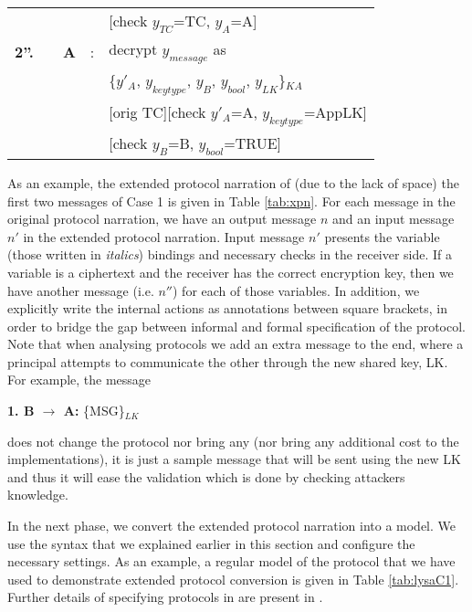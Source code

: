\begin{table}
\begin{tabular}{lllll}
               &                           &            & & [\textnormal{check } $y_{TC}$=TC, $y_A$=A]\\
\textbf{2''.} &                           &\textbf{A} &:& \textnormal{decrypt $y_{message}$ as }   \\
               &                           &            & & \{$y'_A$, $y_{keytype}$, $y_B$, $y_{bool}$, $y_{LK}$\}$_{KA}$\\
               &                           &            & & [\textnormal{orig TC}][\textnormal{check } $y'_A$=A, $y_{keytype}$=AppLK]\\
               &                           &            & & [\textnormal{check } $y_B$=B, $y_{bool}$=TRUE] \\
\hline
\end{tabular}
\end{table}
As an example, the extended protocol narration of (due to the lack of space) the first two messages of Case 1 is given in Table \ref{tab:xpn}. 
For each message in the original protocol narration, we have an output message $n$ and an input message $n'$ in the extended protocol narration.
Input message $n'$ presents the variable (those written in \emph{italics}) bindings and necessary checks in the receiver side.
If a variable is a ciphertext and the receiver has the correct encryption key, then we have another message (i.e. $n''$) for each of those variables.
In addition, we explicitly write the internal actions as annotations between square brackets, in order to bridge the gap between informal and formal specification of the protocol.
Note that when analysing protocols we add an extra message to the end, where a principal attempts to communicate the other through the new shared key, LK. For example, the message
\begin{center} \textbf{1. B \(\rightarrow\) A:} \{MSG\}$_{LK}$ \end{center}
does not change the protocol nor bring any (nor bring any additional cost to the implementations), it is just a sample message that will be sent using the new LK and 
thus it will ease the validation which is done by checking attackers knowledge.

In the next phase, we convert the extended protocol narration into a \LYSA model. 
We use the \LYSA syntax that we explained earlier in this section and configure the necessary settings.
As an example, a regular \LYSA model of the protocol that we have used
to demonstrate extended protocol conversion is given in Table \ref{tab:lysaC1}.
Further details of specifying protocols in \LYSA are present in \cite{bod:1}.

